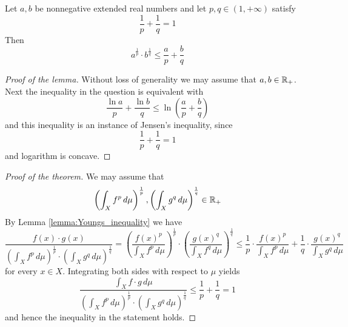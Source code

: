 \begin{lemma}\label{lemma:Youngs_inequality}
Let $a,b$ be nonnegative extended real numbers and let $p,q\in (1,+\infty)$ satisfy 
$$\frac{1}{p} + \frac{1}{q} = 1$$
Then
$$a^{\frac{1}{p}}\cdot b^{\frac{1}{q}} \leq \frac{a}{p} + \frac{b}{q}$$
\end{lemma}
\begin{proof}[Proof of the lemma]
Without loss of generality we may assume that $a,b\in {\mathbb R}_+$. Next the inequality in the question is equivalent with
$$\frac{\ln a}{p} + \frac{\ln b}{q} \leq \ln\left(\frac{a}{p} + \frac{b}{q}\right)$$
and this inequality is an instance of Jensen's inequality, since 
$$\frac{1}{p} + \frac{1}{q} = 1$$
and logarithm is concave.
\end{proof}

\begin{proof}[Proof of the theorem]
We may assume that 
$$\left(\int_Xf^p\,d\mu\right)^{\frac{1}{p}}, \left(\int_Xg^q\,d\mu\right)^{\frac{1}{q}} \in {\mathbb R}_+$$
By Lemma \ref{lemma:Youngs_inequality} we have
$$\frac{f(x)\cdot g(x)}{\left(\int_X f^p\,d\mu\right)^{\frac{1}{p}}\cdot \left(\int_X g^q\,d\mu\right)^{\frac{1}{q}}} = \left(\frac{f(x)^{p}}{\int_X f^p\,d\mu}\right)^{\frac{1}{p}}\cdot \left(\frac{g(x)^{q}}{\int_X f^q\,d\mu}\right)^{\frac{1}{q}} \leq \frac{1}{p}\cdot \frac{f(x)^p}{\int_X f^p\,d\mu} + \frac{1}{q}\cdot \frac{g(x)^q}{\int_X g^q\,d\mu}$$
for every $x \in X$. Integrating both sides with respect to $\mu$ yields
$$\frac{\int_X f\cdot g\,d\mu}{\left(\int_X f^p\,d\mu\right)^{\frac{1}{p}}\cdot \left(\int_X g^q\,d\mu\right)^{\frac{1}{q}}}\leq \frac{1}{p} + \frac{1}{q} = 1$$
and hence the inequality in the statement holds.
\end{proof}

